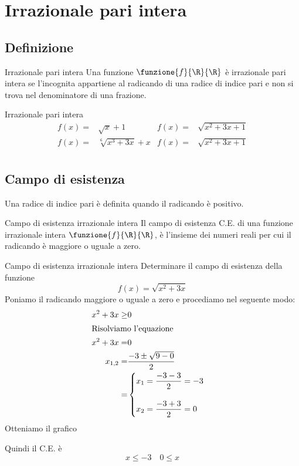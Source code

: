 \section{Irrazionale pari intera}
\subsection{Definizione}
\begin{definizionet}{Irrazionale pari intera}{}
	Una funzione $\funzione{f}{\R}{\R}$ è irrazionale pari intera se l'incognita appartiene al radicando di una radice di indice pari e  non si trova nel denominatore di una frazione.
\end{definizionet}
\begin{esempiot}{Irrazionale pari intera}{}
\begin{align*}
f(x)=&\sqrt{x}+1&f(x)=&\sqrt{x^2+3x+1}\\
f(x)=&\sqrt[6]{x^3+3x}+x&f(x)=&\sqrt{x^2+3x+1}\\
\end{align*}
\end{esempiot}
\subsection{Campo di esistenza}
Una radice di indice pari è definita quando il radicando è positivo.  
\begin{definizionet}{Campo di esistenza irrazionale intera}{}
	Il campo di esistenza C.E. di una funzione irrazionale intera 
	$\funzione{f}{\R}{\R}$, è  l'insieme dei numeri reali per cui il radicando 
	è maggiore o uguale a  zero.
\end{definizionet} 
\begin{esempiot}{Campo di esistenza irrazionale intera}{}
Determinare il campo di esistenza della funzione\[f(x)=\sqrt{x^2+3x}\]Poniamo il radicando maggiore o uguale a zero e procediamo nel seguente modo:
\begin{align*}
x^2+3x\geq& 0\\
\intertext{Risolviamo l'equazione}
x^2+3x=& 0\\
x_{1,2}=&\dfrac{-3\pm\sqrt{9-0}}{2}\\
=&\begin{cases}
x_1=\dfrac{-3-3}{2}=-3\\
\\
x_2=\dfrac{-3+3}{2}=0\\
\end{cases}
\end{align*}
Otteniamo il grafico
\begin{center}

\end{center}
Quindi il C.E.	è
\[x\leq -3\quad 0\leq x\]
\end{esempiot}
